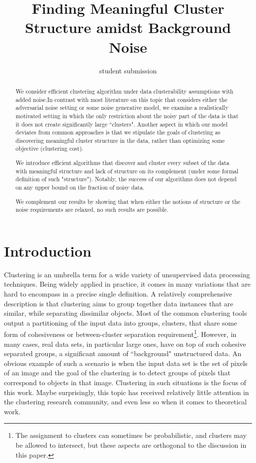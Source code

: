 \documentclass[orivec]{llncs}
\title{Finding Meaningful Cluster Structure amidst Background Noise}
\author{student submission}
\institute{}
\begin{document}
\maketitle

\begin{abstract}

We consider efficient clustering algorithm under data clusterability assumptions with added noise.In contrast with most literature on this topic that considers either the adversarial noise setting
or some noise generative model, we examine a realistically motivated setting in which the only restriction about the noisy part of the data is that it does not
create significantly large ``clusters". Another aspect in which our model deviates from common approaches is that we stipulate the goals of clustering as discovering meaningful cluster structure in the data, rather than optimizing some objective (clustering cost).

We introduce efficient algorithms that discover and cluster every subset of the data with meaningful structure and lack of structure on its complement (under some formal definition of such "structure"). Notably, the success of our algorithms does not depend on any upper bound on the fraction of noisy data.

We complement our results by showing that when either the notions of structure or the noise requirements are relaxed, no such results are possible.
\end{abstract}


\section{Introduction}
\label{sec:intro}
Clustering is an umbrella term for a wide variety of unsupervised data processing techniques. Being widely applied in practice, it comes in many variations that are hard to encompass in a precise single definition. A relatively comprehensive description is  that clustering aims to group together data instances that are similar, while separating dissimilar objects. Most of the common clustering tools output a partitioning of the input data into groups, clusters, that share some form of cohesiveness or between-cluster separation requirement\footnote{The assignment to clusters can sometimes be probabilistic, and clusters may be allowed to intersect, but these aspects are orthogonal to the discussion in this paper.}. However, in many cases, real data sets, in particular large ones, have on top of such cohesive separated groups, a significant amount of ``background" unstructured data. An obvious example of such a scenario is when the input data set is the set of pixels of an image and the goal of the clustering is to detect groups of pixels that correspond to objects in that image. Clustering in such situations is the focus of this work. Maybe surprisingly, this topic has received relatively little attention in the clustering research community, and even less so when it comes to theoretical work. 
\end{document}
